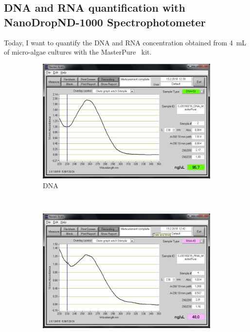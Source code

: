 \subsection{DNA and RNA quantification with NanoDrop\cR ND-1000 Spectrophotometer}
\label{task:20180215_cj0}

Today, I want to quantify the DNA and RNA concentration obtained from 4~mL of micro-algae cultures with the MasterPure\texttrademark~ kit.

\begin{figure}[H] %
    \centering
    \caption{Spectra of the DNA and the RNA extracted from micro-algae cultures with the Modified MasterPure\texttrademark~ method}
    \label{fig:CJ20180215_DNA_RNA_MasterPure}
    \begin{subfigure}[b]{0.49\textwidth}
        \includegraphics[width=\textwidth]{graphics/screenshots/CJ20180215_DNA_MasterPure.png}
        \caption{DNA}
        \label{sfig:CJ20180215_DNA_MasterPure}
    \end{subfigure}
    ~ 
    \begin{subfigure}[b]{0.49\textwidth}
        \includegraphics[width=\textwidth]{graphics/screenshots/CJ20180215_RNA_MasterPure.png}

\end{subfigure}
\end{figure}
